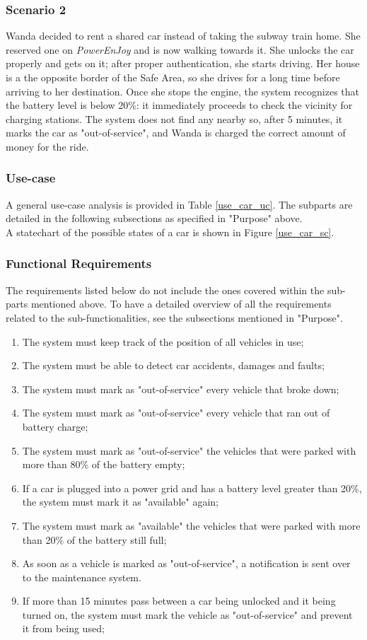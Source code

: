 \subsubsection{Scenario 2}
Wanda decided to rent a shared car instead of taking the subway train home. She reserved one on \emph{PowerEnJoy} and is now walking towards it. She unlocks the car properly and gets on it; after proper authentication, she starts driving. Her house is a the opposite border of the Safe Area, so she drives for a long time before arriving to her destination. Once she stops the engine, the system recognizes that the battery level is below 20\%: it immediately proceeds to check the vicinity for charging stations. The system does not find any nearby so, after 5 minutes, it marks the car as "out-of-service", and Wanda is charged the correct amount of money for the ride.

\subsubsection{Use-case}
A general use-case analysis is provided in Table \ref{use_car_uc}. The subparts are detailed in the following subsections as specified in "Purpose" above. \\
A statechart of the possible states of a car is shown in Figure \ref{use_car_sc}.

\subsubsection{Functional Requirements}
The requirements listed below do not include the ones covered within the sub-parts mentioned above. To have a detailed overview of all the requirements related to the sub-functionalities, see the subsections mentioned in "Purpose".

\begin{enumerate}
\item The system must keep track of the position of all vehicles in use;
\item The system must be able to detect car accidents, damages and faults;
\item The system must mark as "out-of-service" every vehicle that broke down;
\item The system must mark as "out-of-service" every vehicle that ran out of battery charge;
\item The system must mark as "out-of-service" the vehicles that were parked with more than 80\% of the battery empty;
\item If a car is plugged into a power grid and has a battery level greater than 20\%, the system must mark it as "available" again;
\item The system must mark as "available" the vehicles that were parked with more than 20\% of the battery still full;
\item As soon as a vehicle is marked as "out-of-service", a notification is sent over to the maintenance system.
\item If more than 15 minutes pass between a car being unlocked and it being turned on, the system must mark the vehicle as "out-of-service" and prevent it from being used;
\end{enumerate}

